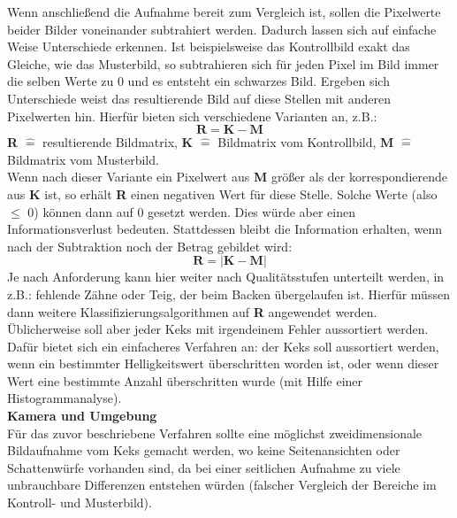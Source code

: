 \documentclass{ezb}
\begin{document}
\newline
Wenn anschließend die Aufnahme bereit zum Vergleich ist, sollen die Pixelwerte beider Bilder voneinander subtrahiert werden. Dadurch lassen sich auf einfache Weise Unterschiede erkennen. Ist beispielsweise das Kontrollbild exakt das Gleiche, wie das Musterbild, so subtrahieren sich für jeden Pixel im Bild immer die selben Werte zu 0 und es entsteht ein schwarzes Bild. Ergeben sich Unterschiede weist das resultierende Bild auf diese Stellen mit anderen Pixelwerten hin. Hierfür bieten sich  verschiedene Varianten an, z.B.:
\begin{equation}
\textbf{R} = \textbf{K} - \textbf{M}
\end{equation}
\textbf{R} $\widehat{=}$ resultierende Bildmatrix, \textbf{K} $\widehat{=}$ Bildmatrix vom Kontrollbild, \textbf{M} $\widehat{=}$ Bildmatrix vom Musterbild. \\
\newline
Wenn nach dieser Variante ein Pixelwert aus \textbf{M} größer als der korrespondierende aus \textbf{K} ist, so erhält \textbf{R} einen negativen Wert für diese Stelle. Solche Werte (also $\leq$ 0) können dann auf 0 gesetzt werden. Dies würde aber einen Informationsverlust bedeuten. Stattdessen bleibt die Information erhalten, wenn nach der Subtraktion noch der Betrag gebildet wird:
\begin{equation}
\textbf{R} = \vert \textbf{K} - \textbf{M} \vert 
\end{equation}
Je nach Anforderung kann hier weiter nach Qualitätsstufen unterteilt werden, in z.B.: fehlende Zähne oder Teig, der beim Backen übergelaufen ist. Hierfür müssen dann weitere Klassifizierungsalgorithmen auf \textbf{R} angewendet werden. Üblicherweise soll aber jeder Keks mit irgendeinem Fehler aussortiert werden. Dafür bietet sich ein einfacheres Verfahren an: der Keks soll aussortiert werden, wenn ein bestimmter Helligkeitswert überschritten worden ist, oder wenn dieser Wert eine bestimmte Anzahl überschritten wurde (mit Hilfe einer Histogrammanalyse).\\ \newline
\textbf{{\large Kamera und Umgebung}}\\
\newline
Für das zuvor beschriebene Verfahren sollte eine möglichst zweidimensionale Bildaufnahme vom Keks gemacht werden, wo keine Seitenansichten oder Schattenwürfe vorhanden sind, da bei einer seitlichen Aufnahme zu viele unbrauchbare Differenzen entstehen würden (falscher Vergleich der Bereiche im Kontroll- und Musterbild).\\
\end{document}
